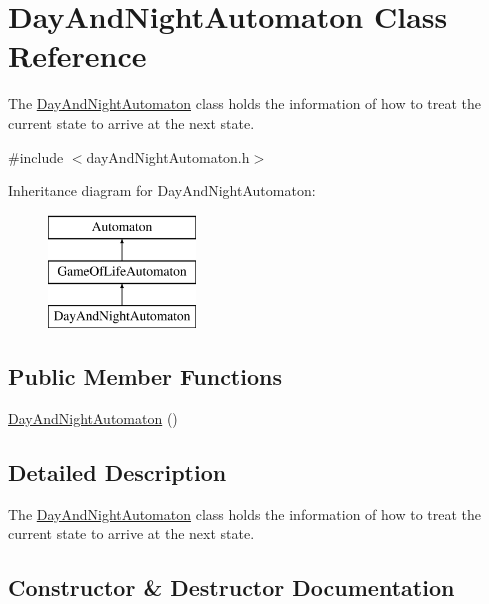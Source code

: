 \hypertarget{class_day_and_night_automaton}{}\section{Day\+And\+Night\+Automaton Class Reference}
\label{class_day_and_night_automaton}


The \mbox{\hyperlink{class_day_and_night_automaton}{Day\+And\+Night\+Automaton}} class holds the information of how to treat the current state to arrive at the next state.  




{\ttfamily \#include $<$day\+And\+Night\+Automaton.\+h$>$}

Inheritance diagram for Day\+And\+Night\+Automaton\+:\begin{figure}[H]
\begin{center}
\leavevmode
\includegraphics[height=3.000000cm]{class_day_and_night_automaton}
\end{center}
\end{figure}
\subsection*{Public Member Functions}
\begin{DoxyCompactItemize}
\item 
\mbox{\hyperlink{class_day_and_night_automaton_a0cd50427070cb34ba59d87d20f14391c}{Day\+And\+Night\+Automaton}} ()
\end{DoxyCompactItemize}


\subsection{Detailed Description}
The \mbox{\hyperlink{class_day_and_night_automaton}{Day\+And\+Night\+Automaton}} class holds the information of how to treat the current state to arrive at the next state. 

\subsection{Constructor \& Destructor Documentation}
\mbox{\label{class_day_and_night_automaton_a0cd50427070cb34ba59d87d20f14391c}} 
